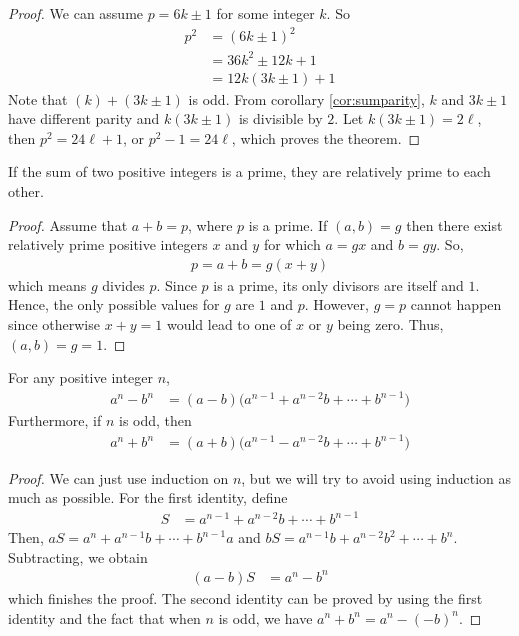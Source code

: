 \documentclass{subfile}
\begin{document}
	\begin{proof}
		We can assume $p=6k\pm1$ for some integer $k$. So
		\begin{align*}
			p^2
				& = (6k\pm1)^2\\
				& = 36k^2\pm12k+1\\
				& = 12k(3k\pm1)+1
		\end{align*}
		Note that $(k)+(3k\pm1)$ is odd. From corollary \eqref{cor:sumparity}, $k$ and $3k\pm1$ have different parity and $k(3k\pm1)$ is divisible by $2$. Let $k(3k\pm1)=2\ell$, then $p^2=24\ell+1$, or $p^2-1=24\ell$, which proves the theorem.
	\end{proof}

	\begin{theorem}
		If the sum of two positive integers is a prime, they are relatively prime to each other.
	\end{theorem}

	\begin{proof}
		Assume that $a+b=p$, where $p$ is a prime. If $(a,b)=g$ then there exist relatively prime positive integers $x$ and $y$ for which $a=gx$ and $b=gy$. So,
		\begin{align*}
			p = a+b = g(x+y)
		\end{align*}
		which means $g$ divides $p$. Since $p$ is a prime, its only divisors are itself and $1$. Hence, the only possible values for $g$ are $1$ and $p$. However, $g=p$ cannot happen since otherwise $x+y=1$ would lead to one of $x$ or $y$ being zero. Thus, $(a,b)=g=1$.
	\end{proof}


	\begin{theorem}\label{id:fatandthin}
		For any positive integer $n$,
		\begin{align*}
			a^n-b^n
				& =(a-b)\Big(a^{n-1}+a^{n-2}b+\cdots+b^{n-1}\Big)
		\end{align*}
		Furthermore, if $n$ is odd, then
		\begin{align*}
			a^n+b^n
				& =(a+b)\Big(a^{n-1}-a^{n-2}b+\cdots+b^{n-1}\Big)
		\end{align*}
		\label{thm:powDiv}
	\end{theorem}
	\begin{proof}
		We can just use induction on $n$, but we will try to avoid using induction as much as possible. For the first identity, define
		\begin{align*}
			S & =a^{n-1}+a^{n-2}b+\cdots+b^{n-1}
		\end{align*}
		Then, $aS=a^n+a^{n-1}b+\cdots+b^{n-1}a$ and $bS=a^{n-1}b+a^{n-2}b^2+\cdots+b^n$. Subtracting, we obtain
		\begin{align*}
			(a-b)S & =a^n-b^n
		\end{align*}
		which finishes the proof. The second identity can be proved by using the first identity and the fact that when $n$ is odd, we have $a^n+b^n=a^n-(-b)^n$.
	\end{proof}
\end{document}
